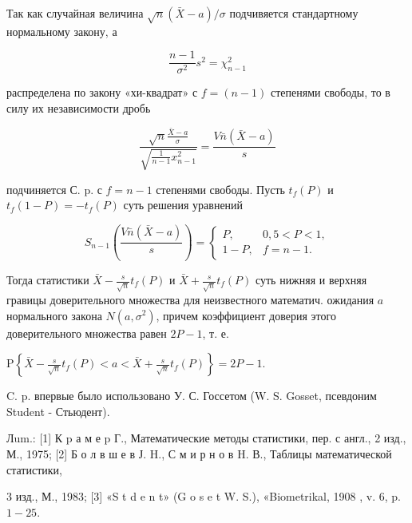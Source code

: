 \documentclass[10pt]{article}
\begin{document}
Так как случайная величина $\sqrt{n}(\bar{X}-a) / \sigma$ подчивяется стандартному нормальному закону, а



\[

\frac{n-1}{\sigma^{2}} s^{2}=\chi_{n-1}^{2}

\]



распределена по закону «хи-квадрат» с $f=(n-1)$ степенями свободы, то в силу их независимости дробь



\[

\frac{\sqrt{n} \frac{\bar{X}-a}{\sigma}}{\sqrt{\frac{1}{n-1} x_{n-1}^{2}}}=\frac{V \bar{n}(\bar{X}-a)}{s}

\]



подчиняется С. p. с $f=n-1$ степенями свободы. Пусть $t_{f}(P)$ и $t_{f}(1-P)=-t_{f}(P)$ суть решения уравнений



\[

S_{n-1}\left(\frac{V \bar{n}(\bar{X}-a)}{s}\right)= \begin{cases}P, & 0,5<P<1, \\ 1-P, & f=n-1 .\end{cases}

\]



Тогда статистики $\bar{X}-\frac{s}{\sqrt{n}} t_{f}(P)$ и $\bar{X}+\frac{s}{\sqrt{n}} t_{f}(P)$ суть нижняя и верхняя гравицы доверительного множества для неизвестного математич. ожидания $a$ нормального закона $N\left(a, \sigma^{2}\right)$, причем коэффициент доверия этого доверительного множества равен $2 P-1$, т. е.



$\mathrm{P}\left\{\bar{X}-\frac{s}{\sqrt{n}} t_{f}(P)<a<\bar{X}+\frac{s}{\sqrt{n}} t_{f}(P)\right\}=2 P-1$.



C. p. впервые было использовано У. С. Госсетом (W. S. Gosset, псевдоним Student - Стьюдент).



Лum.: [1] К $\mathrm{p}$ а м е $\mathrm{p}$ Г., Математические методы статистики, пер. с англ., 2 изд., М., 1975; [2] Б о л в ш е в Ј. H., С м и р н о в H. В., Таблицы математической статистики,

3 изд., М., 1983; [3] «S t d e n t» (G o s e t W. S.), «Biometrikal, 1908 , v. 6, p. $1-25$.
\end{document}
